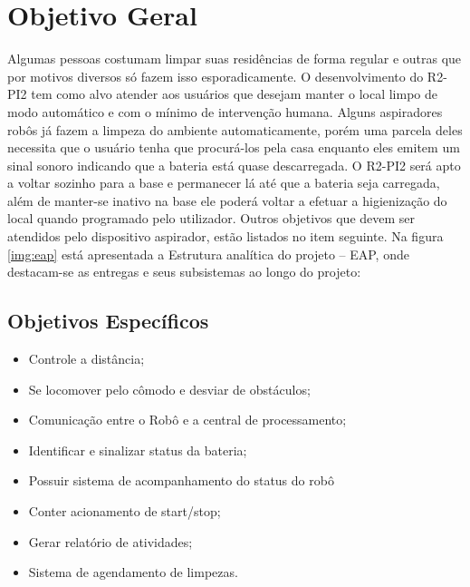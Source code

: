 
\section{Objetivo Geral} %
\label{sub:objetivo_geral}
	
	Algumas pessoas costumam limpar suas residências de forma regular e outras que por motivos diversos só fazem isso esporadicamente. O desenvolvimento do R2-PI2 tem como alvo atender aos usuários que desejam manter o local limpo de modo automático e com o mínimo de intervenção humana. Alguns aspiradores robôs já fazem a limpeza do ambiente automaticamente, porém uma parcela deles necessita que o usuário tenha que procurá-los pela casa enquanto eles emitem um sinal sonoro indicando que a bateria está quase descarregada. O R2-PI2 será apto a voltar sozinho para a base e permanecer lá até que a bateria seja carregada, além de manter-se inativo na base ele poderá voltar a efetuar a higienização do local quando programado pelo utilizador. Outros objetivos que devem ser atendidos pelo dispositivo aspirador, estão listados no item seguinte.
	Na figura \ref{img:eap} está apresentada a Estrutura analítica do projeto – EAP, onde destacam-se as entregas e seus subsistemas ao longo do projeto:


\subsection{Objetivos Específicos} %
\label{sub:objetivos_específicos}
	
	\begin{itemize}
		\item Controle a distância;
		\item Se locomover pelo cômodo e desviar de obstáculos;
		\item Comunicação entre o Robô e a central de processamento;
		\item Identificar e sinalizar status da bateria;
		\item Possuir sistema de acompanhamento do status do robô
		\item Conter acionamento de start/stop;
		\item Gerar relatório de atividades;
		\item Sistema de agendamento de limpezas.
	\end{itemize}
